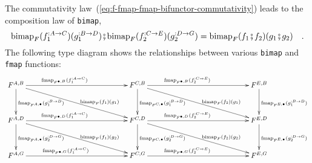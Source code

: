 The commutativity law~(\ref{eq:f-fmap-fmap-bifunctor-commutativity})
leads to the composition law of \lstinline!bimap!,
\begin{equation}
\text{bimap}_{F}(f_{1}^{:A\rightarrow C})(g_{1}^{:B\rightarrow D})\bef\text{bimap}_{F}(f_{2}^{:C\rightarrow E})(g_{2}^{:D\rightarrow G})=\text{bimap}_{F}(f_{1}\bef f_{2})(g_{1}\bef g_{2})\quad.\label{eq:f-bimap-composition-law}
\end{equation}
The following type diagram shows the relationships between various
\lstinline!bimap! and \lstinline!fmap! functions:
\[
\xymatrix{\xyScaleY{3.0pc}\xyScaleX{12.0pc}F^{A,B}\ar[rd]\sp(0.6){~~~\text{bimap}_{F}(f_{1})(g_{1})}\ar[r]\sp(0.4){\text{fmap}_{F^{\bullet,B}}(f_{1}^{:A\rightarrow C})}\ar[d]\sp(0.5){\text{fmap}_{F^{A,\bullet}}(g_{1}^{:B\rightarrow D})} & F^{C,B}\ar[rd]\sp(0.6){~~~\text{bimap}_{F}(f_{2})(g_{1})}\ar[r]\sp(0.4){~\text{fmap}_{F^{\bullet,B}}(f_{2}^{:C\rightarrow E})}\ar[d]\sp(0.5){\text{fmap}_{F^{C,\bullet}}(g_{1}^{:B\rightarrow D})~~~} & F^{E,B}\ar[d]\sp(0.5){\text{fmap}_{F^{E,\bullet}}(g_{1}^{:B\rightarrow D})}\\
F^{A,D}\ar[rd]\sp(0.6){~~~\text{bimap}_{F}(f_{1})(g_{2})}\ar[r]\sp(0.4){\text{fmap}_{F^{\bullet,D}}(f_{1}^{:A\rightarrow C})}\ar[d]\sp(0.5){\text{fmap}_{F^{A,\bullet}}(g_{2}^{:D\rightarrow G})} & F^{C,D}\ar[rd]\sp(0.6){~~~\text{bimap}_{F}(f_{2})(g_{2})}\ar[r]\sp(0.4){~\text{fmap}_{F^{\bullet,D}}(f_{2}^{:C\rightarrow E})}\ar[d]\sp(0.5){\text{fmap}_{F^{C,\bullet}}(g_{2}^{:D\rightarrow G})~~~} & F^{E,D}\ar[d]\sp(0.5){\text{fmap}_{F^{E,\bullet}}(g_{2}^{:D\rightarrow G})}\\
F^{A,G}\ar[r]\sp(0.4){~\text{fmap}_{F^{\bullet,G}}(f_{1}^{:A\rightarrow C})} & F^{C,G}\ar[r]\sp(0.4){~\text{fmap}_{F^{\bullet,G}}(f_{2}^{:C\rightarrow E})} & F^{E,G}
}
\]

